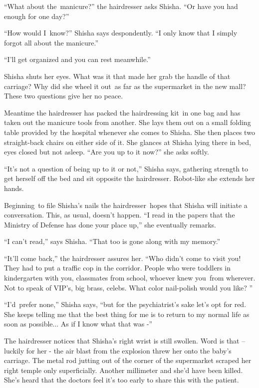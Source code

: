 \documentclass[twoside,11pt]{book}
\begin{document}
``What about the~manicure?'' the hairdresser asks Shisha. ``Or have you had
enough for one day?'' 

``How would I~know?'' Shisha says despondently. ``I only know that I simply
forgot all about the manicure.'' 

``I'll get organized and you can rest meanwhile.'' 

Shisha shuts her eyes. What was it that made her grab the handle of that carriage? Why did she wheel it out\ as far as
the supermarket in the new mall? These two questions give her no peace. 

Meantime the hairdresser has packed the hairdressing kit~in one bag and has taken out the manicure tools from another.
She lays them out on a small folding table provided by the hospital whenever she comes to Shisha. She then places two
straight-back chairs on either side of it. She glances at Shisha lying there in bed, eyes closed but not asleep.
``Are you up to it now?'' she asks softly.

``It's not a question of being up to it or not,'' Shisha says, gathering strength to get
herself off the bed and sit opposite the hairdresser. Robot-like she extends her hands. 

Beginning~to file Shisha's nails the hairdresser\ hopes that Shisha will initiate a conversation. This, as usual,
doesn't happen. ``I read in the papers that the Ministry of Defense has done your place up,''
she eventually remarks. 

``I can't read,'' says Shisha. ``That too is gone along with my
memory.'' 

``It'll come back,'' the hairdresser assures her. ``Who didn't come to visit you!
They had to put a traffic cop in the corridor. People who were toddlers in kindergarten with you, classmates from
school, whoever knew you\ from wherever. Not to speak of VIP's, big brass, celebs. What color nail-polish would you
like? '' 

``I'd{\ }prefer none,'' Shisha says,
``but for the psychiatrist's sake let's opt for red. She keeps telling me that the best thing for me is to
return to my normal life as soon as possible... As if I know what that was -'' ~

The hairdresser notices that Shisha's right wrist is still swollen. Word is that -- luckily for her - the air blast from
the explosion threw her onto the baby's carriage. The metal rod jutting out of the corner of the supermarket scraped
her right temple only superficially. Another millimeter and she'd have been killed. She's heard that the doctors feel
it's too early to share this with the patient.
\end{document}
